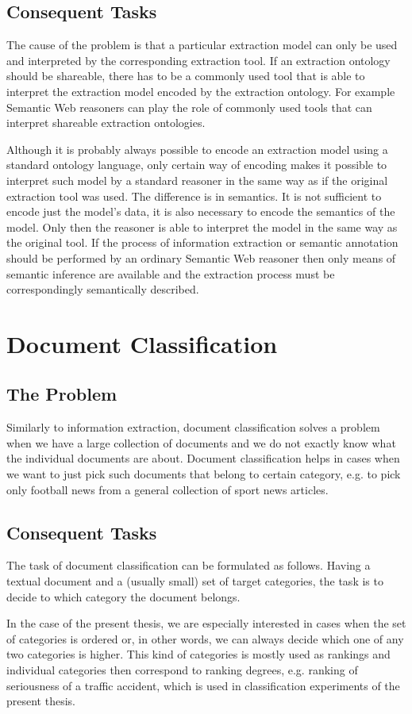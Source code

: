 \subsection{Consequent Tasks}

The cause of the problem is that a particular extraction model can only be used and interpreted by the corresponding extraction tool. If an extraction ontology should be shareable, there has to be a commonly used tool that is able to interpret the extraction model encoded by the extraction ontology. For example Semantic Web reasoners can play the role of commonly used tools that can interpret shareable extraction ontologies.



Although it is probably always possible to encode an extraction model using a standard ontology language, only certain way of encoding makes it possible to interpret such model by a standard reasoner in the same way as if the original extraction tool was used. The difference is in semantics. It is not sufficient to encode just the model's data, it is also necessary to encode the semantics of the model. Only then the reasoner is able to interpret the model in the same way as the original tool. If the process of information extraction or semantic annotation should be performed by an ordinary Semantic Web reasoner then only means of semantic inference are available and the extraction process must be correspondingly semantically described.

\section{Document Classification}

\subsection{The Problem}

Similarly to information extraction, document classification solves a problem when we have a large collection of documents and we do not exactly know what the individual documents are about. Document classification helps in cases when we want to just pick such documents that belong to certain category, e.g. to pick only football news from a general collection of sport news articles. 

\subsection{Consequent Tasks}

The task of document classification can be formulated as follows. Having a textual document and a (usually small) set of target categories, the task is to decide to which category the document belongs. 

In the case of the present thesis, we are especially interested in cases when the set of categories is ordered or, in other words, we can always decide which one of any two categories is higher. This kind of categories is mostly used as rankings and individual categories then correspond to ranking degrees, e.g. ranking of seriousness of a traffic accident, which is used in classification experiments of the present thesis.
